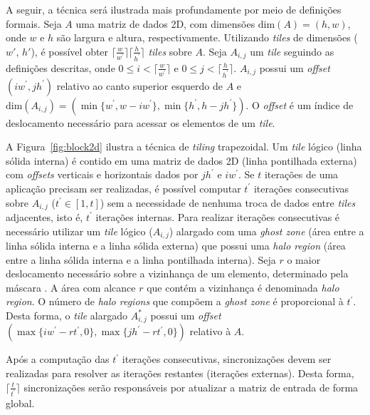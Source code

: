 A seguir, a técnica será ilustrada mais profundamente
por meio de definições formais. Seja $A$ uma matriz de dados 2D, com dimensões
$\textrm{dim}(A) = (h,w)$, onde $w$ e $h$ são largura e altura, respectivamente.
Utilizando \textit{tiles} de dimensões ($w'$, $h'$), é possível obter
$\lceil\frac{w}{w^\prime}\rceil\lceil\frac{h}{h^\prime}\rceil$ \textit{tiles}
sobre $A$. Seja $A_{i,j}$ um \textit{tile} seguindo as definições descritas,
onde $0 \leq i < \lceil\frac{w}{w^\prime}\rceil$ e $0\leq j <
\lceil\frac{h}{h^\prime}\rceil$. $A_{i,j}$ possui um \textit{offset} $(i
w^\prime, j h^\prime)$ relativo ao canto superior esquerdo de $A$ e
$\textrm{dim}(A_{i,j}) = (\min\{w^\prime, w-i w^\prime\}, \min\{h^\prime, h-j
h^\prime\})$. O \textit{offset} é um índice de deslocamento necessário para
acessar os elementos de um \textit{tile}.

A Figura~\ref{fig:block2d} ilustra a técnica de \textit{tiling} trapezoidal. Um
\textit{tile} lógico (linha sólida interna) é contido em uma matriz de dados 2D
(linha pontilhada externa) com \textit{offsets} verticais e horizontais dados
por $jh^\prime$ e $iw^\prime$. Se $t$ iterações de uma aplicação \stencil
precisam ser realizadas, é possível computar $t^\prime$ iterações consecutivas
sobre $A_{i,j}$ ($t^\prime \in \left[1,t\right]$) sem a necessidade de nenhuma
troca de dados entre \textit{tiles} adjacentes, isto é, $t^\prime$ iterações
internas. Para realizar iterações consecutivas é necessário utilizar um
\textit{tile} lógico ($A_{i,j}$) alargado com uma \textit{ghost zone} (área
entre a linha sólida interna e a linha sólida externa) que possui uma
\textit{halo region} (área entre a linha sólida interna e a linha pontilhada
interna). Seja $r$ o maior deslocamento necessário sobre a vizinhança de um
elemento, determinado pela máscara \stencil. A área com alcance $r$ que contém a
vizinhança é denominada \textit{halo region}. O número de \textit{halo regions}
que compõem a \textit{ghost zone} é proporcional à $t^\prime$. Desta forma, o
\textit{tile} alargado $A^\ast_{i,j}$ possui um \textit{offset} $(\max\{iw^\prime -
rt^\prime, 0\}, \max\{jh^\prime - rt^\prime, 0\})$ relativo à $A$.

Após a computação das $t^\prime$ iterações consecutivas,
sincronizações devem ser realizadas para resolver as iterações restantes
(iterações externas). Desta forma, $\lceil\frac{t}{t^\prime}\rceil$
sincronizações serão responsáveis por atualizar a matriz de entrada de forma
global.

